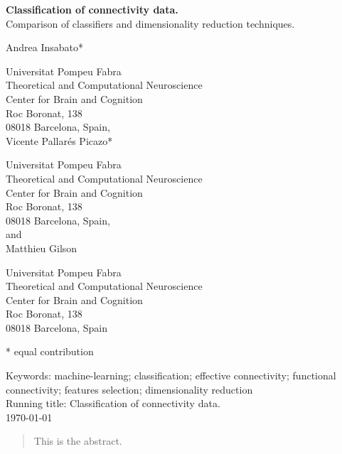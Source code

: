 \documentclass[12pt, a4paper, final, fleqn]{article}
\begin{document}
\begin{center}

\vspace*{2cm}

{ \Large {\bf Classification of connectivity data.} \\
Comparison of classifiers and dimensionality reduction techniques.}


\vspace*{2cm}

\large
Andrea Insabato*

\normalsize
{Universitat Pompeu Fabra \\
Theoretical and Computational Neuroscience\\
Center for Brain and Cognition \\
Roc Boronat, 138\\
08018 Barcelona, Spain,} \\[1 cm]

\large
Vicente Pallar\'es Picazo*

\normalsize
{Universitat Pompeu Fabra \\
Theoretical and Computational Neuroscience\\
Center for Brain and Cognition \\
Roc Boronat, 138\\
08018 Barcelona, Spain,} \\[1 cm]

and \\%

\large
Matthieu Gilson

\normalsize
{Universitat Pompeu Fabra \\
Theoretical and Computational Neuroscience\\
Center for Brain and Cognition \\
Roc Boronat, 138\\
08018 Barcelona, Spain} \\
\end{center}

* equal contribution

Keywords:  machine-learning; classification; effective connectivity; functional connectivity; features selection; dimensionality reduction\\
Running title: Classification of connectivity data.\\
\today

\newpage
\doublespacing
\begin{abstract}
This is the abstract.
\end{abstract}
\end{document}
